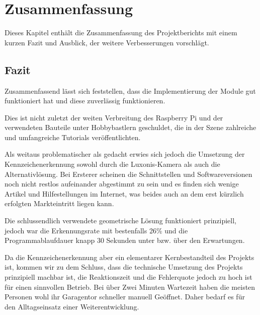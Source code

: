 \chapter{Zusammenfassung}

\nocite{*}

Dieses Kapitel enthält die Zusammenfassung des Projektberichts mit einem kurzen Fazit und Ausblick, der weitere Verbesserungen vorschlägt.

\section{Fazit}
Zusammenfassend lässt sich feststellen, dass die Implementierung der Module gut funktioniert hat und diese zuverlässig funktionieren.

Dies ist nicht zuletzt der weiten Verbreitung des Raspberry Pi und der verwendeten Bauteile unter Hobbybastlern geschuldet, die in der Szene zahlreiche und umfangreiche Tutorials veröffentlichten.

Als weitaus problematischer als gedacht erwies sich jedoch die Umsetzung der Kennzeichenerkennung sowohl durch die Luxonis-Kamera als auch die Alternativlösung. Bei Ersterer scheinen die Schnittstellen und Softwareversionen noch nicht restlos aufeinander abgestimmt zu sein und es finden sich wenige Artikel und Hilfestellungen im Internet, was beides auch an dem erst kürzlich erfolgten Markteintritt liegen kann.

Die schlussendlich verwendete geometrische Lösung funktioniert prinzipiell, jedoch war die Erkennungsrate mit bestenfalls 26\% und die Programmablaufdauer knapp 30 Sekunden unter bzw. über den Erwartungen. 

Da die Kennzeichenerkennung aber ein elementarer Kernbestandteil des Projekts ist, kommen wir zu dem Schluss, dass die technische Umsetzung des Projekts prinzipiell machbar ist, die Reaktionszeit und die Fehlerquote jedoch zu hoch ist für einen sinnvollen Betrieb. Bei über Zwei Minuten Wartezeit haben die meisten Personen wohl ihr Garagentor schneller manuell Geöffnet. Daher bedarf es für den Alltagseinsatz einer Weiterentwicklung.

